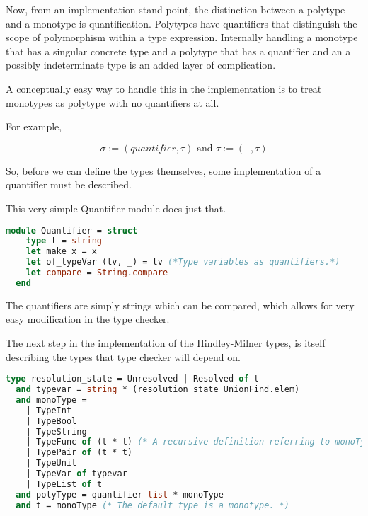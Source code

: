 \documentclass{l4proj}
\begin{document}
Now, from an implementation stand point, the distinction between a polytype and a monotype is quantification.
Polytypes have quantifiers that distinguish the scope of polymorphism within a type expression.
Internally handling a monotype that has a singular concrete type and a polytype that has a quantifier and an a possibly indeterminate type is an added layer of complication.

A conceptually easy way to handle this in the implementation is to treat monotypes as polytype with no quantifiers at all.

For example,

\[\sigma := (quantifier, \tau) \text{ and } \tau := (\;\;, \tau)\]

So, before we can define the types themselves, some implementation of a quantifier must be described.

This very simple Quantifier module does just that.

\begin{lstlisting}[language=Caml, caption=The PyFunc type checker's quantifier module.]
  module Quantifier = struct
    type t = string
    let make x = x
    let of_typeVar (tv, _) = tv (*Type variables as quantifiers.*)
    let compare = String.compare
  end
\end{lstlisting}

The quantifiers are simply strings which can be compared, which allows for very easy modification in the type checker.

The next step in the implementation of the Hindley-Milner types, is itself describing the types that type checker will depend on.

\begin{lstlisting}[language=Caml]
  type resolution_state = Unresolved | Resolved of t
  and typevar = string * (resolution_state UnionFind.elem)
  and monoType = 
    | TypeInt
    | TypeBool
    | TypeString
    | TypeFunc of (t * t) (* A recursive definition referring to monoType. *)
    | TypePair of (t * t)
    | TypeUnit
    | TypeVar of typevar
    | TypeList of t
  and polyType = quantifier list * monoType
  and t = monoType (* The default type is a monotype. *)
\end{lstlisting}
\end{document}
